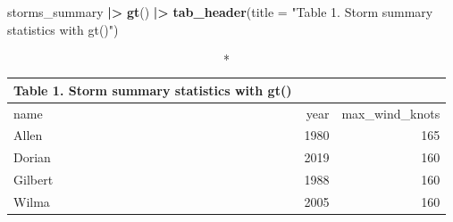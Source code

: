 \documentclass[
]{article}
\newenvironment{Shaded}{\begin{snugshade}}{\end{snugshade}}
\newcommand{\AttributeTok}[1]{\textcolor[rgb]{0.13,0.29,0.53}{#1}}
\newcommand{\FunctionTok}[1]{\textcolor[rgb]{0.13,0.29,0.53}{\textbf{#1}}}
\newcommand{\NormalTok}[1]{#1}
\newcommand{\SpecialCharTok}[1]{\textcolor[rgb]{0.81,0.36,0.00}{\textbf{#1}}}
\newcommand{\StringTok}[1]{\textcolor[rgb]{0.31,0.60,0.02}{#1}}
\begin{document}
\begin{Shaded}
\begin{Highlighting}[]
\NormalTok{storms\_summary }\SpecialCharTok{|\textgreater{}} 
  \FunctionTok{gt}\NormalTok{() }\SpecialCharTok{|\textgreater{}} 
  \FunctionTok{tab\_header}\NormalTok{(}\AttributeTok{title =} \StringTok{"Table 1. Storm summary statistics with gt()"}\NormalTok{)}
\end{Highlighting}
\end{Shaded}

\begin{longtable}{lrr}
\caption*{
{\large Table 1. Storm summary statistics with gt()}
} \\ 
\toprule
name & year & max\_wind\_knots \\ 
\midrule\addlinespace[2.5pt]
Allen & 1980 & 165 \\ 
Dorian & 2019 & 160 \\ 
Gilbert & 1988 & 160 \\ 
Wilma & 2005 & 160 \\ 
\bottomrule
\end{longtable}
\end{document}
